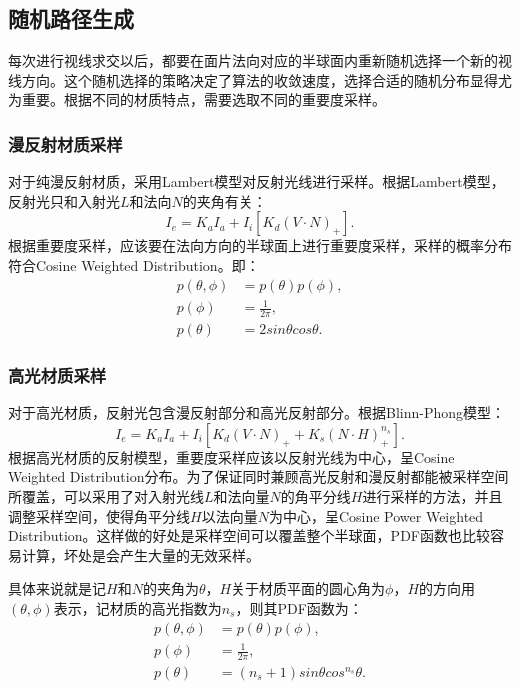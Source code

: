 \documentclass[10pt,a4paper]{article}
\begin{document}
\subsection{随机路径生成}
每次进行视线求交以后，都要在面片法向对应的半球面内重新随机选择一个新的视线方向。这个随机选择的策略决定了算法的收敛速度，选择合适的随机分布显得尤为重要。根据不同的材质特点，需要选取不同的重要度采样。

\subsubsection{漫反射材质采样}
对于纯漫反射材质，采用Lambert模型对反射光线进行采样。根据Lambert模型，反射光只和入射光$L$和法向$N$的夹角有关：
\begin{equation}
  I_e = K_a I_a + I_i[K_d (V \cdot N)_+].
\end{equation}
根据重要度采样，应该要在法向方向的半球面上进行重要度采样，采样的概率分布符合Cosine Weighted Distribution。即：
\begin{equation}
  \begin{split}
    p(\theta, \phi) &= p(\theta)p(\phi),  \\
    p(\phi) &= \frac{1}{2\pi},  \\
    p(\theta) &= 2 sin\theta cos\theta.
  \end{split}
\end{equation}

\subsubsection{高光材质采样}
对于高光材质，反射光包含漫反射部分和高光反射部分。根据Blinn-Phong模型：
\begin{equation}
  I_e = K_a I_a + I_i[K_d(V \cdot N)_+ + K_s(N \cdot H)^{n_s}_+].
\end{equation}
根据高光材质的反射模型，重要度采样应该以反射光线为中心，呈Cosine Weighted Distribution分布。为了保证同时兼顾高光反射和漫反射都能被采样空间所覆盖，可以采用了对入射光线$L$和法向量$N$的角平分线$H$进行采样的方法，并且调整采样空间，使得角平分线$H$以法向量$N$为中心，呈Cosine Power Weighted Distribution。这样做的好处是采样空间可以覆盖整个半球面，PDF函数也比较容易计算，坏处是会产生大量的无效采样。

具体来说就是记$H$和$N$的夹角为$\theta$，$H$关于材质平面的圆心角为$\phi$，$H$的方向用$(\theta, \phi)$表示，记材质的高光指数为$n_s$，则其PDF函数为：
\begin{equation}
  \begin{split}
    p(\theta, \phi) &= p(\theta)p(\phi),  \\
    p(\phi) &= \frac{1}{2\pi},  \\
    p(\theta) &= (n_s+1) sin\theta cos^{n_s}\theta.
  \end{split}
\end{equation}
\end{document}
